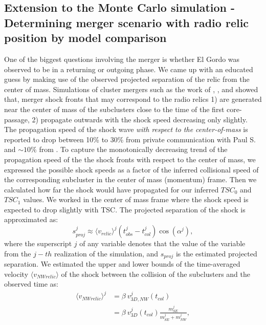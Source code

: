 
\subsection{Extension to the Monte Carlo simulation - Determining merger
scenario with radio relic position by model comparison}

One of the biggest questions involving the merger is whether El Gordo was
observed to be in a returning or outgoing phase. We came up with an
educated guess by making use of the observed projected separation of the relic from the
center of mass.
Simulations of cluster mergers such as the work of \citet{Paul2011b},
\citet{VanWeerenRJ2011}, and \citet{Springel2007} showed that, merger shock
fronts that may correspond to the radio relics 1) are generated near the
center of mass of the subclusters close to the time of the first
core-passage, 2) propagate outwards with the shock speed decreasing only slightly.
The propagation speed of the shock wave {\it with respect to the
center-of-mass} is reported to drop between 10\% to
30\% from private communication with Paul S. and $\sim 10\%$ from
\citet{Springel2007}. To capture the monotonically decreasing trend of the
propagation speed of the the shock fronts with respect to the center of
mass, we expressed the possible shock speeds as a factor of the inferred
collisional speed of the corresponding subcluster in the center of mass
(momentum) frame. 
Then we calculated how far the shock would have propagated for our inferred
$TSC_0$ and $TSC_1$ values. We worked in the center of mass frame where the
shock speed is expected to drop slightly with TSC. 
The projected separation of the shock is approximated as:
\begin{equation}
	s^j_{proj} \approx \langle v_{relic} \rangle^j (t^j_{obs} - t^j_{col})
	\cos(\alpha^j),
	\label{eq:proj_s_model}
\end{equation}
where the superscript $j$ of any variable denotes that the value of the
variable from the $j-th$ realization of the simulation, and $s_{proj}$ is the estimated projected
separation. We estimated the upper and lower bounds of the time-averaged velocity
$\langle v_{NW relic} \rangle$ of the shock between
the collision of the subclusters and the observed time as:  
\begin{align}
	\label{eqn:NW_speed}
	\langle v_{NW relic} \rangle^j &= \beta~v^j_{3D, NW}(t_{col}) \\
	&= \beta~v^j_{3D}(t_{col}) \frac{m^j_{SE}}{m^j_{SE} + m^j_{NW}}, 
\end{align}
